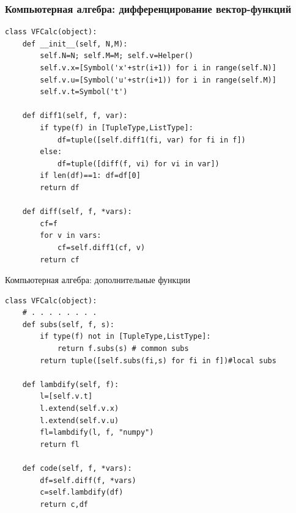 \documentclass[10pt]{beamer}
\begin{document}
\begin{frame}[fragile]
  \frametitle{Компьютерная алгебра: дифференцирование вектор-функций}
\begin{lstlisting}
class VFCalc(object):
    def __init__(self, N,M):
        self.N=N; self.M=M; self.v=Helper()
        self.v.x=[Symbol('x'+str(i+1)) for i in range(self.N)]
        self.v.u=[Symbol('u'+str(i+1)) for i in range(self.M)]
        self.v.t=Symbol('t')

    def diff1(self, f, var):
        if type(f) in [TupleType,ListType]:
            df=tuple([self.diff1(fi, var) for fi in f])
        else:
            df=tuple([diff(f, vi) for vi in var])
        if len(df)==1: df=df[0]
        return df

    def diff(self, f, *vars):
        cf=f
        for v in vars:
            cf=self.diff1(cf, v)
        return cf
\end{lstlisting}
\end{frame}
\begin{frame}[fragile]{Компьютерная алгебра: дополнительные функции}
\begin{lstlisting}
class VFCalc(object):
    # . . . . . . . .
    def subs(self, f, s):
        if type(f) not in [TupleType,ListType]:
            return f.subs(s) # common subs
        return tuple([self.subs(fi,s) for fi in f])#local subs

    def lambdify(self, f):
        l=[self.v.t]
        l.extend(self.v.x)
        l.extend(self.v.u)
        fl=lambdify(l, f, "numpy")
        return fl

    def code(self, f, *vars):
        df=self.diff(f, *vars)
        c=self.lambdify(df)
        return c,df
\end{lstlisting}
\end{frame}

\end{document}
